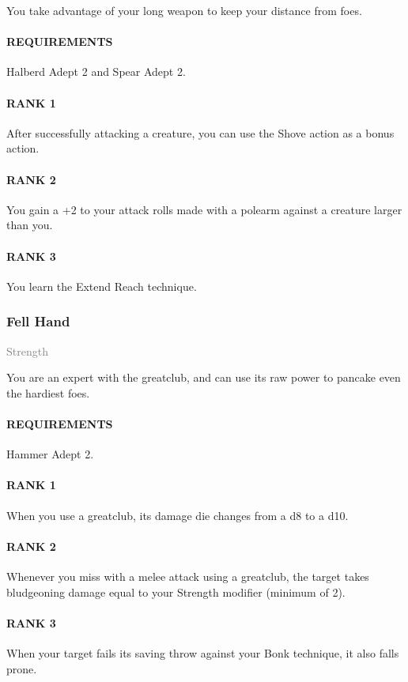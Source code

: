 \normalsize
You take advantage of your long weapon to keep your distance from foes.
\paragraph{REQUIREMENTS} Halberd Adept 2 and Spear Adept 2.
\paragraph{RANK 1} After successfully attacking a creature, you can use the Shove action as a bonus action.
\paragraph{RANK 2} You gain a +2 to your attack rolls made with a polearm against a creature larger than you.
\paragraph{RANK 3} You learn the Extend Reach technique.

\subsubsection{Fell Hand} \label{feat::fellhand}
\small{\textcolor{gray}{Strength}}

\normalsize
You are an expert with the greatclub, and can use its raw power to pancake even the hardiest foes.
\paragraph{REQUIREMENTS} Hammer Adept 2.
\paragraph{RANK 1} When you use a greatclub, its damage die changes from a d8 to a d10.
\paragraph{RANK 2} Whenever you miss with a melee attack using a greatclub, the target takes bludgeoning damage equal to your Strength modifier (minimum of 2).
\paragraph{RANK 3} When your target fails its saving throw against your Bonk technique, it also falls prone.

